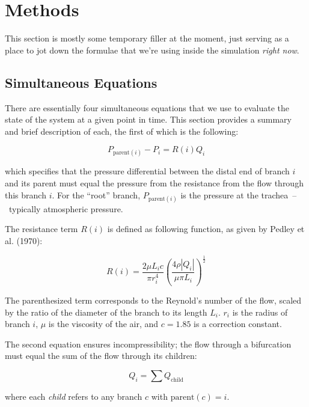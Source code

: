 \section{Methods}

This section is mostly some temporary filler at the moment, just serving as a place to jot down the
formulae that we're using inside the simulation \textit{right now}.

\subsection{Simultaneous Equations}

There are essentially four simultaneous equations that we use to evaluate the state of the system at
a given point in time. This section provides a summary and brief description of each, the first of
which is the following:

\begin{equation}
    P_{\text{parent}(i)} - P_i = R(i) Q_i
\end{equation}

\noindent
which specifies that the pressure differential between the distal end of branch $i$ and its parent
must equal the pressure from the resistance from the flow through this branch $i$. For the ``root''
branch, $P_{\text{parent}(i)}$ is the pressure at the trachea~--~typically atmospheric pressure.

The resistance term $R(i)$ is defined as following function, as given by Pedley et al. (1970):

\begin{equation*}
    R(i) = \frac{2 \mu L_i c}{\pi r_i^4} \left( \frac{4 \rho |Q_i|}{\mu \pi L_i} \right)^{\frac{1}{2}}
\end{equation*}

The parenthesized term corresponds to the Reynold's number of the flow, scaled by the ratio of the
diameter of the branch to its length $L_i$. $r_i$ is the radius of branch $i$, $\mu$ is the
viscosity of the air, and $c = 1.85$ is a correction constant.

The second equation ensures incompressibility; the flow through a bifurcation must equal the sum of
the flow through its children:

\begin{equation}
    Q_i = \sum Q_{\text{child}}
\end{equation}

\noindent
where each \textit{child} refers to any branch $c$ with $\text{parent}(c) = i$.

